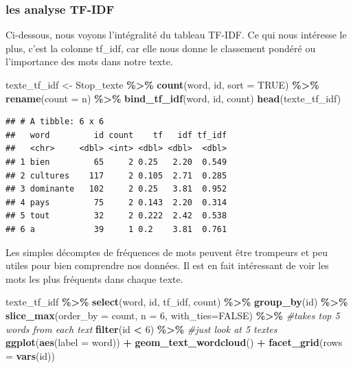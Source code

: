 \documentclass[
]{article}
\newenvironment{Shaded}{\begin{snugshade}}{\end{snugshade}}
\newcommand{\AttributeTok}[1]{\textcolor[rgb]{0.13,0.29,0.53}{#1}}
\newcommand{\CommentTok}[1]{\textcolor[rgb]{0.56,0.35,0.01}{\textit{#1}}}
\newcommand{\ConstantTok}[1]{\textcolor[rgb]{0.56,0.35,0.01}{#1}}
\newcommand{\DecValTok}[1]{\textcolor[rgb]{0.00,0.00,0.81}{#1}}
\newcommand{\FunctionTok}[1]{\textcolor[rgb]{0.13,0.29,0.53}{\textbf{#1}}}
\newcommand{\NormalTok}[1]{#1}
\newcommand{\OtherTok}[1]{\textcolor[rgb]{0.56,0.35,0.01}{#1}}
\newcommand{\SpecialCharTok}[1]{\textcolor[rgb]{0.81,0.36,0.00}{\textbf{#1}}}
\begin{document}
\subsubsection{les analyse TF-IDF}\label{les-analyse-tf-idf}

Ci-dessous, nous voyons l'intégralité du tableau TF-IDF. Ce qui nous
intéresse le plus, c'est la colonne tf\_idf, car elle nous donne le
classement pondéré ou l'importance des mots dans notre texte.

\begin{Shaded}
\begin{Highlighting}[]
\NormalTok{texte\_tf\_idf }\OtherTok{\textless{}{-}}\NormalTok{ Stop\_texte }\SpecialCharTok{\%\textgreater{}\%}
  \FunctionTok{count}\NormalTok{(word, id, }\AttributeTok{sort =} \ConstantTok{TRUE}\NormalTok{) }\SpecialCharTok{\%\textgreater{}\%}
  \FunctionTok{rename}\NormalTok{(}\AttributeTok{count =}\NormalTok{ n) }\SpecialCharTok{\%\textgreater{}\%}
  \FunctionTok{bind\_tf\_idf}\NormalTok{(word, id, count)}
\FunctionTok{head}\NormalTok{(texte\_tf\_idf)}
\end{Highlighting}
\end{Shaded}

\begin{verbatim}
## # A tibble: 6 x 6
##   word         id count    tf   idf tf_idf
##   <chr>     <dbl> <int> <dbl> <dbl>  <dbl>
## 1 bien         65     2 0.25   2.20  0.549
## 2 cultures    117     2 0.105  2.71  0.285
## 3 dominante   102     2 0.25   3.81  0.952
## 4 pays         75     2 0.143  2.20  0.314
## 5 tout         32     2 0.222  2.42  0.538
## 6 a            39     1 0.2    3.81  0.761
\end{verbatim}

Les simples décomptes de fréquences de mots peuvent être trompeurs et
peu utiles pour bien comprendre nos données. Il est en fait intéressant
de voir les mots les plus fréquents dans chaque texte.

\begin{Shaded}
\begin{Highlighting}[]
\NormalTok{texte\_tf\_idf }\SpecialCharTok{\%\textgreater{}\%}
  \FunctionTok{select}\NormalTok{(word, id, tf\_idf, count) }\SpecialCharTok{\%\textgreater{}\%}
  \FunctionTok{group\_by}\NormalTok{(id) }\SpecialCharTok{\%\textgreater{}\%}
  \FunctionTok{slice\_max}\NormalTok{(}\AttributeTok{order\_by =}\NormalTok{ count, }\AttributeTok{n =} \DecValTok{6}\NormalTok{, }\AttributeTok{with\_ties=}\ConstantTok{FALSE}\NormalTok{) }\SpecialCharTok{\%\textgreater{}\%} \CommentTok{\#takes top 5 words from each text}
  \FunctionTok{filter}\NormalTok{(id }\SpecialCharTok{\textless{}} \DecValTok{6}\NormalTok{) }\SpecialCharTok{\%\textgreater{}\%} \CommentTok{\#just look at 5 textes}
  \FunctionTok{ggplot}\NormalTok{(}\FunctionTok{aes}\NormalTok{(}\AttributeTok{label =}\NormalTok{ word)) }\SpecialCharTok{+} 
  \FunctionTok{geom\_text\_wordcloud}\NormalTok{() }\SpecialCharTok{+} 
  \FunctionTok{facet\_grid}\NormalTok{(}\AttributeTok{rows =} \FunctionTok{vars}\NormalTok{(id))}
\end{Highlighting}
\end{Shaded}
\end{document}
